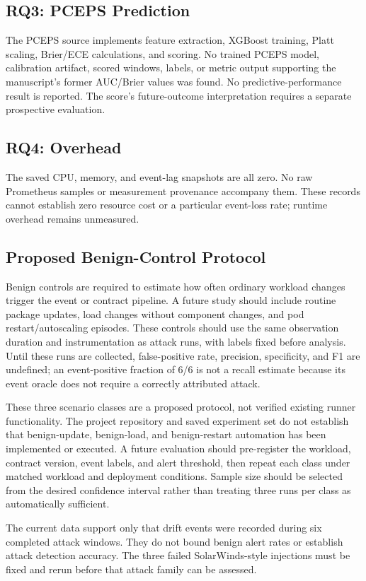 \documentclass[conference]{IEEEtran}
\begin{document}
\subsection{RQ3: PCEPS Prediction}
The PCEPS source implements feature extraction, XGBoost training, Platt scaling, Brier/ECE calculations, and scoring. No trained PCEPS model, calibration artifact, scored windows, labels, or metric output supporting the manuscript's former AUC/Brier values was found. No predictive-performance result is reported. The score's future-outcome interpretation requires a separate prospective evaluation.

\subsection{RQ4: Overhead}
The saved CPU, memory, and event-lag snapshots are all zero. No raw Prometheus samples or measurement provenance accompany them. These records cannot establish zero resource cost or a particular event-loss rate; runtime overhead remains unmeasured.

\subsection{Proposed Benign-Control Protocol}
Benign controls are required to estimate how often ordinary workload changes trigger the event or contract pipeline. A future study should include routine package updates, load changes without component changes, and pod restart/autoscaling episodes. These controls should use the same observation duration and instrumentation as attack runs, with labels fixed before analysis. Until these runs are collected, false-positive rate, precision, specificity, and F1 are undefined; an event-positive fraction of 6/6 is not a recall estimate because its event oracle does not require a correctly attributed attack.

These three scenario classes are a proposed protocol, not verified existing runner functionality. The project repository and saved experiment set do not establish that benign-update, benign-load, and benign-restart automation has been implemented or executed. A future evaluation should pre-register the workload, contract version, event labels, and alert threshold, then repeat each class under matched workload and deployment conditions. Sample size should be selected from the desired confidence interval rather than treating three runs per class as automatically sufficient.

The current data support only that drift events were recorded during six completed attack windows. They do not bound benign alert rates or establish attack detection accuracy. The three failed SolarWinds-style injections must be fixed and rerun before that attack family can be assessed.
\end{document}
